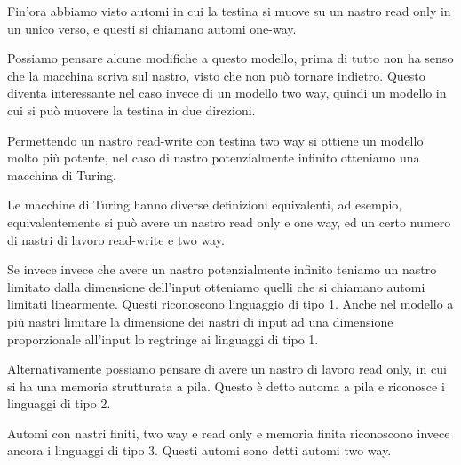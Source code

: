 \documentclass[12pt]{article}
\begin{document}
\tableofcontents
\newpage
Fin'ora abbiamo visto automi in cui la testina si muove su un nastro read only in un unico verso, e questi si chiamano automi one-way.

Possiamo pensare alcune modifiche a questo modello, prima di tutto non ha senso che la macchina scriva sul nastro, visto che non può tornare indietro.
Questo diventa interessante nel caso invece di un modello two way, quindi un modello in cui si può muovere la testina in due direzioni.

Permettendo un nastro read-write con testina two way si ottiene un modello molto più potente, nel caso di nastro potenzialmente infinito otteniamo una macchina di Turing.

Le macchine di Turing hanno diverse definizioni equivalenti, ad esempio, equivalentemente si può avere un nastro read only e one way, ed un certo numero di nastri di lavoro read-write e two way.

Se invece invece che avere un nastro potenzialmente infinito teniamo un nastro limitato dalla dimensione dell'input otteniamo quelli che si chiamano automi limitati linearmente.
Questi riconoscono linguaggio di tipo 1.
Anche nel modello a più nastri limitare la dimensione dei nastri di input ad una dimensione proporzionale all'input lo regtringe ai linguaggi di tipo 1.

Alternativamente possiamo pensare di avere un nastro di lavoro read only, in cui si ha una memoria strutturata a pila.
Questo è detto automa a pila e riconosce i linguaggi di tipo 2.

Automi con nastri finiti, two way e read only e memoria finita riconoscono invece ancora i linguaggi di tipo 3.
Questi automi sono detti automi two way.
\end{document}

